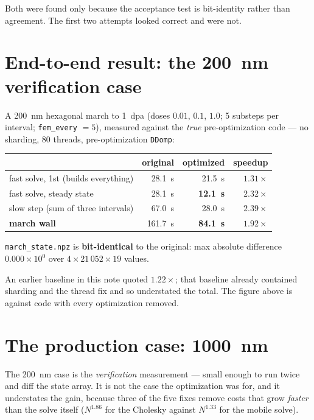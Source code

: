 \documentclass[11pt]{article}
\begin{document}
Both were found only because the acceptance test is bit-identity rather than
agreement. The first two attempts looked correct and were not.

\section{End-to-end result: the \SI{200}{\nano\meter} verification case}
A \SI{200}{\nano\meter} hexagonal march to \SI{1}{dpa} (doses $0.01$, $0.1$,
$1.0$; 5 substeps per interval; \texttt{fem\_every} $=5$), measured against the
\emph{true} pre-optimization code --- no sharding, 80 threads, pre-optimization
\texttt{DDomp}:

\begin{center}
\begin{tabular}{lrrr}
\toprule
 & original & optimized & speedup\\
\midrule
fast solve, 1st (builds everything) & \SI{28.1}{\second} & \SI{21.5}{\second} & $1.31\times$\\
fast solve, steady state & \SI{28.1}{\second} & \textbf{\SI{12.1}{\second}} & $\mathbf{2.32\times}$\\
slow step (sum of three intervals) & \SI{67.0}{\second} & \SI{28.0}{\second} & $2.39\times$\\
\rowcolor{green!12}
\textbf{march wall} & \SI{161.7}{\second} & \textbf{\SI{84.1}{\second}} & $\mathbf{1.92\times}$\\
\bottomrule
\end{tabular}
\end{center}

\texttt{march\_state.npz} is \textbf{bit-identical} to the original: max
absolute difference $0.000\times10^{0}$ over $4\times21\,052\times19$ values.

An earlier baseline in this note quoted $1.22\times$; that baseline already
contained sharding and the thread fix and so understated the total. The figure
above is against code with every optimization removed.

\section{The production case: \SI{1000}{\nano\meter}}
\label{sec:prod}
The \SI{200}{\nano\meter} case is the \emph{verification} measurement --- small
enough to run twice and diff the state array. It is not the case the
optimization was for, and it understates the gain, because three of the five
fixes remove costs that grow \emph{faster} than the solve itself
($N^{1.86}$ for the Cholesky against $N^{1.33}$ for the mobile solve).
\end{document}
